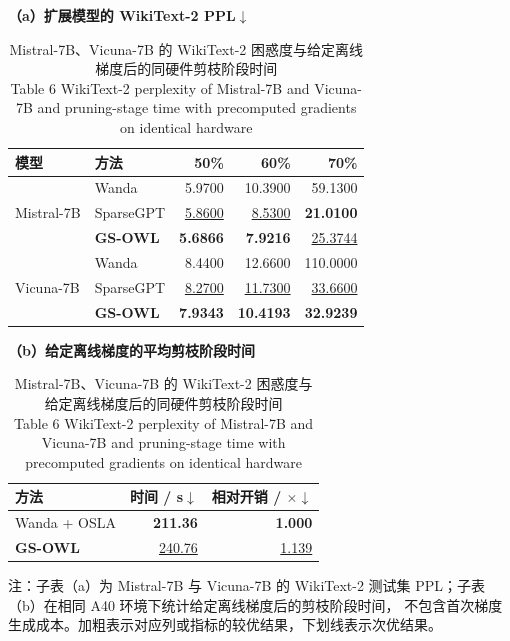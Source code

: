 \documentclass[UTF8,fontset=fandol]{ctexart}
\renewcommand{\arraystretch}{1.08}
\newcommand{\best}[1]{\textbf{#1}}
\newcommand{\second}[1]{\underline{#1}}
\begin{document}
\begin{table}[!htbp]
\centering
\caption{Mistral-7B、Vicuna-7B 的 WikiText-2 困惑度与给定离线梯度后的同硬件剪枝阶段时间\\
Table 6 WikiText-2 perplexity of Mistral-7B and Vicuna-7B and pruning-stage time with precomputed gradients on identical hardware}
\label{tab:generalization}
\begin{minipage}{0.62\textwidth}
\centering
\scriptsize
\textbf{（a）扩展模型的 WikiText-2 PPL$\downarrow$}\par\vspace{2pt}
\setlength{\tabcolsep}{3.4pt}
\renewcommand{\arraystretch}{0.98}
\begin{tabular}{llrrr}
\toprule
模型 & 方法 & 50\% & 60\% & 70\% \\
\midrule
\multirow{3}{*}{Mistral-7B}
 & Wanda & 5.9700 & 10.3900 & 59.1300 \\
 & SparseGPT & \second{5.8600} & \second{8.5300} & \best{21.0100} \\
 & \textbf{GS-OWL} & \best{5.6866} & \best{7.9216} & \second{25.3744} \\
\midrule
\multirow{3}{*}{Vicuna-7B}
 & Wanda & 8.4400 & 12.6600 & 110.0000 \\
 & SparseGPT & \second{8.2700} & \second{11.7300} & \second{33.6600} \\
 & \textbf{GS-OWL} & \best{7.9343} & \best{10.4193} & \best{32.9239} \\
\bottomrule
\end{tabular}
\end{minipage}
\hfill
\begin{minipage}{0.34\textwidth}
\centering
\scriptsize
\textbf{（b）给定离线梯度的平均剪枝阶段时间}\par\vspace{2pt}
\setlength{\tabcolsep}{3.6pt}
\renewcommand{\arraystretch}{1.00}
\begin{tabular}{lrr}
\toprule
方法 & 时间 / s$\downarrow$ & 相对开销 / $\times$$\downarrow$ \\
\midrule
Wanda + OSLA & \best{211.36} & \best{1.000} \\
\textbf{GS-OWL} & \second{240.76} & \second{1.139} \\
\bottomrule
\end{tabular}
\end{minipage}
\vspace{2pt}
\parbox{0.96\textwidth}{\scriptsize
注：子表（a）为 Mistral-7B 与 Vicuna-7B 的 WikiText-2 测试集 PPL；子表（b）在相同 A40 环境下统计给定离线梯度后的剪枝阶段时间，
不包含首次梯度生成成本。加粗表示对应列或指标的较优结果，下划线表示次优结果。}
\end{table}
\end{document}
